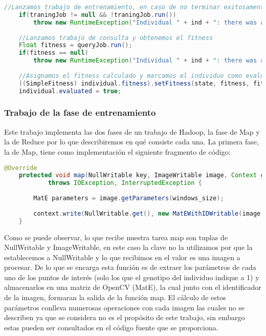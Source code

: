  \begin{lstlisting}[language=Java]
 	//Lanzamos trabajo de entrenamiento, en caso de no terminar exitosamente lanzamos una excepcion
	if(traningJob != null && !traningJob.run())
		throw new RuntimeException("Individual " + ind + ": there was a problem during the training phase");
		
	//Lanzamos trabajo de consulta y obtenemos el fitness
	Float fitness = queryJob.run();
	if(fitness == null)
		throw new RuntimeException("Individual " + ind + ": there was a problem during the query phase");
			
	//Asignamos el fitness calculado y marcamos el individuo como evaluado
	((SimpleFitness) individual.fitness).setFitness(state, fitness, fitness >= 1F);
	individual.evaluated = true;	
\end{lstlisting}

\subsubsection{Trabajo de la fase de entrenamiento}

Este trabajo implementa las dos fases de un trabajo de Hadoop, la fase de Map y la de Reduce por lo que describiremos en qu\'e consiste cada una. La primera fase, la de Map, tiene como implementación el siguiente fragmento de c\'odigo:

 \begin{lstlisting}[language=Java]
	@Override
	protected void map(NullWritable key, ImageWritable image, Context context)
			throws IOException, InterruptedException {
		
		MatE parameters = image.getParameters(windows_size);
		
		context.write(NullWritable.get(), new MatEWithIDWritable(image.getId(), parameters));
	}
\end{lstlisting}

Como se puede observar, lo que recibe nuestra tarea map son tuplas de NullWritable y ImageWritable, en este caso la clave no la utilizamos por que la establecemos a NullWritable y lo que recibimos en el valor es una imagen a procesar. De lo que se encarga esta función es de extraer los parámetros de cada uno de los puntos de interés (solo los que el genotipo del individuo indique a 1) y almacenarlos en una matriz de OpenCV (MatE), la cual junto con el identificador de la imagen, formaran la salida de la función map. El c\'alculo de estos parámetros conlleva numerosas operaciones con cada imagen las cuales no se describen ya que se considera no es el propósito de este trabajo, sin embargo estas pueden ser consultados en el código fuente que se proporciona.

